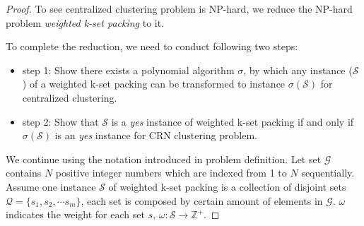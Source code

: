 \begin{proof}
To see centralized clustering problem is NP-hard, we reduce the NP-hard problem \textit{weighted k-set packing} to it.

To complete the reduction, we need to conduct following two steps:
\begin{itemize}
\item step 1: Show there exists a polynomial algorithm $\sigma$, by which any instance (\eg $\mathcal{S}$) of a weighted k-set packing can be transformed to instance $\sigma(\mathcal{S})$ for centralized clustering.
\item step 2: Show that $\mathcal{S}$ is a \textit{yes} instance of weighted k-set packing if and only if $\sigma(\mathcal{S})$ is an \textit{yes} instance for CRN clustering problem.
\end{itemize}

We continue using the notation introduced in problem definition.
Let set $\mathcal{G}$ contains $N$ positive integer numbers which are indexed from 1 to $N$ sequentially.
Assume one instance $\mathcal{S}$ of weighted k-set packing is a collection of disjoint sets $\mathcal{Q} = \{s_1, s_2,\cdots s_m\}$, each set is composed by certain amount of elements in $\mathcal{G}$.
$\omega$ indicates the weight for each set $s$, $\omega:\mathcal{S}\rightarrow \mathbb{Z}^{+}$.




\end{proof}
